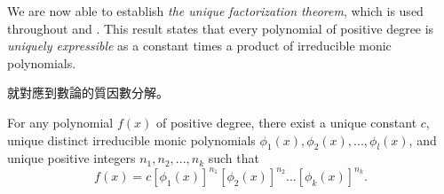We are now able to establish \emph{the unique factorization theorem}, which is used throughout  and .
This result states that every polynomial of positive degree is \emph{uniquely expressible} as a constant times a product of irreducible monic polynomials.

\begin{note}
就對應到數論的質因數分解。
\end{note}

\begin{appendix theorem}  \label{thm e.9}
For any polynomial \(f(x)\) of positive degree, there exist a unique constant \(c\), unique distinct irreducible monic polynomials \(\phi_1(x), \phi_2(x), ..., \phi_l(x)\), and unique positive integers \(n_1, n_2, ..., n_k\) such that
\[
    f(x) = c[\phi_1(x)]^{n_1}[\phi_2(x)]^{n_2}...[\phi_k(x)]^{n_k}.
\]
\end{appendix theorem}

